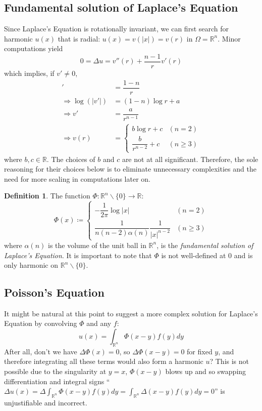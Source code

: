 \documentclass[openany, amssymb, psamsfonts]{amsart}
\theoremstyle{definition}
\newtheorem{defn}{Definition}[section]
\numberwithin{equation}{section}
\newcommand{\bbr}{\mathbb{R}}
\let\implies\Rightarrow
\begin{document}
\subsection{Fundamental solution of Laplace's Equation}
Since Laplace's Equation is rotationally invariant, we can first search for harmonic $u(x)$ that is radial: $u(x) = v(|x|) = v(r)$ in $\Omega = \bbr^n$. Minor computations yield \[
    0 = \Delta u = v''(r) + \dfrac{n-1}{r}v'(r)
\]
which implies, if $v' \neq 0$, \begin{align*}
    [\log(|v'|)]'       & = \dfrac{1-n}{r}                                            \\
    \implies \log(|v'|) & = (1-n)\log r + a                                           \\
    \implies v'         & = \dfrac{a}{r^{n-1}}                                        \\
    \implies v(r)       & = \begin{cases}
                                b \log r + c           & (n=2)      \\
                                \dfrac{b}{r^{n-2}} + c & (n \geq 3)
                            \end{cases}
\end{align*}
where $b, c \in \bbr$. The choices of $b$ and $c$ are not at all significant. Therefore, the sole reasoning for their choices below is to eliminate unnecessary complexities and the need for more scaling in computations later on.

\begin{defn}
    The function $\Phi: \bbr^n \backslash \{0\} \to \bbr$: \[
        \Phi (x) \coloneqq \begin{cases}
            -\dfrac{1}{2 \pi} \log |x|                      & (n=2)      \\
            \dfrac{1}{n(n-2)\alpha(n)} \dfrac{1}{|x|^{n-2}} & (n \geq 3)
        \end{cases}
    \]
    where $\alpha(n)$ is the volume of the unit ball in $\bbr^n$, is the \textit{fundamental solution of Laplace's Equation}. It is important to note that $\Phi$ is not well-defined at $0$ and is only harmonic on $\bbr^n \backslash \{0\}$.
\end{defn}

\subsection{Poisson's Equation}
It might be natural at this point to suggest a more complex solution for Laplace's Equation by convolving $\Phi$ and any $f$:
\[
    u(x) = \int_{\bbr^n} \Phi(x-y)f(y) dy
\]
After all, don't we have $\Delta \Phi(x) = 0$, so $\Delta \Phi(x - y) = 0$ for fixed $y$, and therefore integrating all these terms would also form a harmonic $u$? This is not possible due to the singularity at $y = x$, $\Phi(x-y)$ blows up and so swapping differentiation and integral signs ``$\Delta u(x) = \Delta \int_{\bbr^n} \Phi(x-y)f(y)dy = \int_{\bbr^n} \Delta (x-y)f(y) dy = 0$'' is unjustifiable and incorrect.
\end{document}
